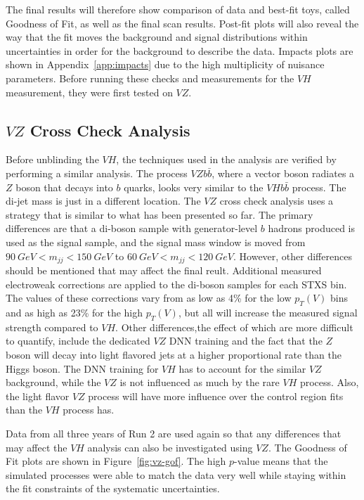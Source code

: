 The final results will therefore show comparison of data and best-fit toys,
called Goodness of Fit, as well as the final scan results.
Post-fit plots will also reveal the way that the fit moves the background and signal distributions
within uncertainties in order for the background to describe the data.
Impacts plots are shown in Appendix~\ref{app:impacts} due to the high multiplicity of nuisance parameters.
Before running these checks and measurements for the $V\!H$ measurement,
they were first tested on $V\!Z$.  

\subsection{$V\!Z$ Cross Check Analysis}

Before unblinding the $V\!H$, the techniques used in the analysis are
verified by performing a similar analysis.
The process $V\!Zb\bar{b}$, where a vector boson radiates a $Z$ boson that decays into $b$ quarks,
looks very similar to the $V\!Hb\bar{b}$ process.
The di-jet mass is just in a different location.
The $V\!Z$ cross check analysis uses a strategy that is similar to what has been presented so far.
The primary differences are that a di-boson sample with generator-level $b$ hadrons produced
is used as the signal sample, and the signal mass window is moved from $\SI{90}{GeV} < m_{jj} < \SI{150}{GeV}$
to  $\SI{60}{GeV} < m_{jj} < \SI{120}{GeV}$.
However, other differences should be mentioned that may affect the final reult.
Additional measured electroweak corrections are applied to the di-boson samples for each STXS bin.
The values of these corrections vary from as low as 4\% for the low $p_T(V)$ bins
and as high as 23\% for the high $p_T(V)$, but all will increase the measured signal strength compared to $V\!H$.
Other differences,the effect of which are more difficult to quantify, include the dedicated $V\!Z$ DNN training and
the fact that the $Z$ boson will decay into light flavored jets at a higher proportional rate than the Higgs boson.
The DNN training for $V\!H$ has to account for the similar $V\!Z$ background,
while the $V\!Z$ is not influenced as much by the rare $V\!H$ process.
Also, the light flavor $V\!Z$ process will have more influence over
the control region fits than the $V\!H$ process has.

Data from all three years of Run 2 are used again so that any differences that may affect the $V\!H$ analysis
can also be investigated using $V\!Z$.
The Goodness of Fit plots \cite{cousins2013generalization} are shown in
Figure~\ref{fig:vz-gof}.
The high $p$-value means that the simulated processes were able to match the data very well
while staying within the fit constraints of the systematic
uncertainties.

